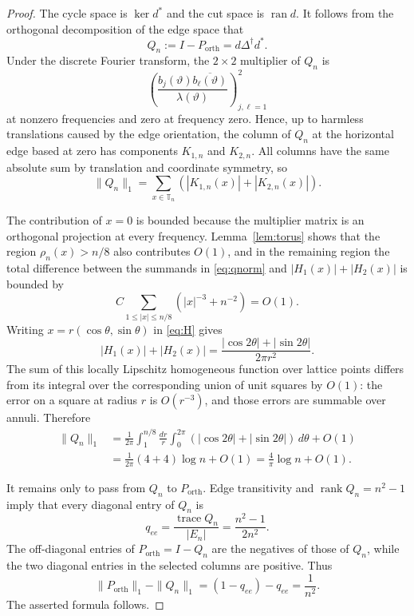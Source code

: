 \documentclass[11pt]{article}
\newcommand{\T}{\mathbb T}
\newcommand{\orth}{\mathrm{orth}}
\begin{document}
\begin{proof}
The cycle space is $\ker d^*$ and the cut space is $\operatorname{ran}d$.
It follows from the orthogonal decomposition of the edge space that
\[
 Q_n:=I-P_{\orth}=d\Delta^\dagger d^*.
\]
Under the discrete Fourier transform, the $2\times2$ multiplier of $Q_n$
is
\[
 \left(\frac{b_j(\vartheta)\overline{b_\ell(\vartheta)}}
 {\lambda(\vartheta)}\right)_{j,\ell=1}^2
\]
at nonzero frequencies and zero at frequency zero.  Hence, up to harmless
translations caused by the edge orientation, the column of $Q_n$ at the
horizontal edge based at zero has components $K_{1,n}$ and $K_{2,n}$.
All columns have the same absolute sum by translation and coordinate
symmetry, so
\begin{equation}\label{eq:qnorm}
 \|Q_n\|_1=\sum_{x\in\T_n}
 (|K_{1,n}(x)|+|K_{2,n}(x)|).
\end{equation}

The contribution of $x=0$ is bounded because the multiplier matrix is an
orthogonal projection at every frequency.  Lemma~\ref{lem:torus} shows
that the region $\rho_n(x)>n/8$ also contributes $O(1)$, and in the
remaining region the total difference between the summands in
\eqref{eq:qnorm} and $|H_1(x)|+|H_2(x)|$ is bounded by
\[
 C\sum_{1\le|x|\le n/8}(|x|^{-3}+n^{-2})=O(1).
\]
Writing $x=r(\cos\theta,\sin\theta)$ in \eqref{eq:H} gives
\[
 |H_1(x)|+|H_2(x)|
 =\frac{|\cos2\theta|+|\sin2\theta|}{2\pi r^2}.
\]
The sum of this locally Lipschitz homogeneous function over lattice points
differs from its integral over the corresponding union of unit squares by
$O(1)$: the error on a square at radius $r$ is $O(r^{-3})$, and those
errors are summable over annuli.  Therefore
\begin{align*}
 \|Q_n\|_1
 &=\frac1{2\pi}\int_1^{n/8}\frac{dr}{r}
   \int_0^{2\pi}(|\cos2\theta|+|\sin2\theta|)\,d\theta+O(1)\\
 &=\frac1{2\pi}(4+4)\log n+O(1)
 =\frac4\pi\log n+O(1).
\end{align*}

It remains only to pass from $Q_n$ to $P_{\orth}$.  Edge transitivity and
$\operatorname{rank}Q_n=n^2-1$ imply that every diagonal entry of $Q_n$ is
\[
 q_{ee}=\frac{\operatorname{trace}Q_n}{|E_n|}
 =\frac{n^2-1}{2n^2}.
\]
The off-diagonal entries of $P_{\orth}=I-Q_n$ are the negatives of those
of $Q_n$, while the two diagonal entries in the selected columns are
positive.  Thus
\[
 \|P_{\orth}\|_1-\|Q_n\|_1
 =(1-q_{ee})-q_{ee}=\frac1{n^2}.
\]
The asserted formula follows.
\end{proof}
\end{document}
